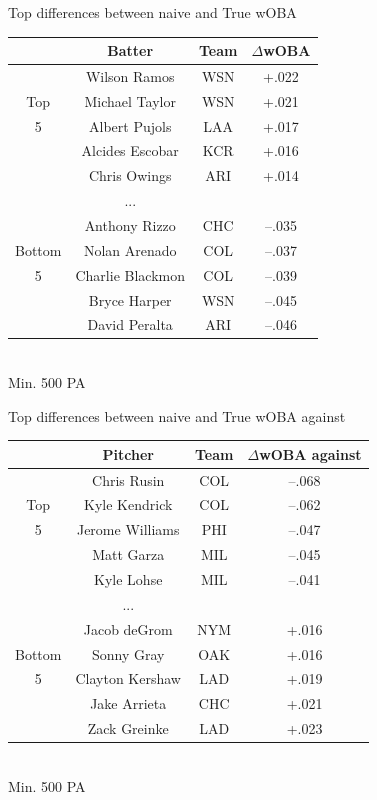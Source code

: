 \documentclass{beamer}
\begin{document}
\begin{frame}{Top differences between naive and True wOBA}
\centering
\scriptsize
\hspace*{-0.5cm}
\begin{tabular}{c|ccc}
      &Batter      &Team& $\Delta$wOBA\\
\hline
      &Wilson Ramos    &WSN & +.022\\
Top   &Michael Taylor  &WSN & +.021\\
5     &Albert Pujols   &LAA & +.017\\
      &Alcides Escobar &KCR & +.016\\
      &Chris Owings    &ARI & +.014\\
      & ...            &    &      \\
      &Anthony Rizzo   &CHC &--.035\\
Bottom&Nolan Arenado   &COL &--.037\\
5     &Charlie Blackmon&COL &--.039\\
      &Bryce Harper    &WSN &--.045\\
      &David Peralta   &ARI &--.046
\end{tabular}
\\
\vspace{5mm}
Min. 500 PA
\end{frame}

\begin{frame}{Top differences between naive and True wOBA against}
\centering
\scriptsize
\hspace*{-0.5cm}
\begin{tabular}{c|ccc}
      &Pitcher     &Team&$\Delta$wOBA against\\
\hline
      &Chris Rusin    &COL &--.068\\
Top   &Kyle Kendrick  &COL &--.062\\
5     &Jerome Williams&PHI &--.047\\
      &Matt Garza     &MIL &--.045\\
      &Kyle Lohse     &MIL &--.041\\
      &...            &    &      \\
      &Jacob deGrom   &NYM & +.016\\
Bottom&Sonny Gray     &OAK & +.016\\
5     &Clayton Kershaw&LAD & +.019\\
      &Jake Arrieta   &CHC & +.021\\
      &Zack Greinke   &LAD & +.023
\end{tabular}
\\
\vspace{5mm}
Min. 500 PA
\end{frame}
\end{document}
